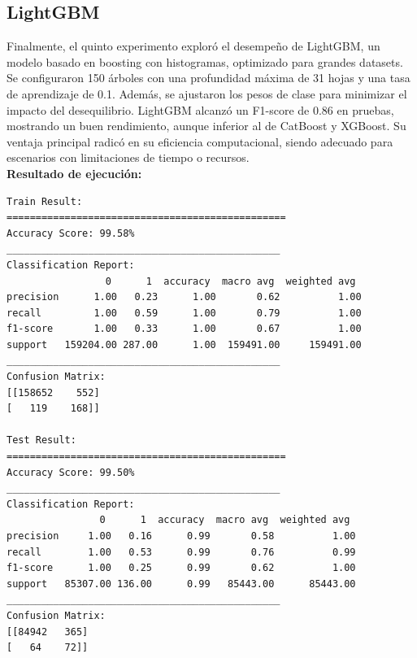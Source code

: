 \documentclass[9pt,a4paper,twoside]{rho-class/rho}
\begin{document}
        \subsection{LightGBM}
            Finalmente, el quinto experimento exploró el desempeño de LightGBM, un modelo basado en boosting con histogramas, optimizado para grandes datasets. Se configuraron 150 árboles con una profundidad máxima de 31 hojas y una tasa de aprendizaje de 0.1. Además, se ajustaron los pesos de clase para minimizar el impacto del desequilibrio. LightGBM alcanzó un F1-score de 0.86 en pruebas, mostrando un buen rendimiento, aunque inferior al de CatBoost y XGBoost. Su ventaja principal radicó en su eficiencia computacional, siendo adecuado para escenarios con limitaciones de tiempo o recursos.
        \\    
        \textbf{Resultado de ejecución:}\\
\small
\begin{verbatim}
Train Result:
================================================
Accuracy Score: 99.58%
_______________________________________________
Classification Report:
                 0      1  accuracy  macro avg  weighted avg
precision      1.00   0.23      1.00       0.62          1.00
recall         1.00   0.59      1.00       0.79          1.00
f1-score       1.00   0.33      1.00       0.67          1.00
support   159204.00 287.00      1.00  159491.00     159491.00
_______________________________________________
Confusion Matrix: 
[[158652    552]
[   119    168]]

Test Result:
================================================
Accuracy Score: 99.50%
_______________________________________________
Classification Report:
                0      1  accuracy  macro avg  weighted avg
precision     1.00   0.16      0.99       0.58          1.00
recall        1.00   0.53      0.99       0.76          0.99
f1-score      1.00   0.25      0.99       0.62          1.00
support   85307.00 136.00      0.99   85443.00      85443.00
_______________________________________________
Confusion Matrix: 
[[84942   365]
[   64    72]]
\end{verbatim}
\normalsize
\end{document}
